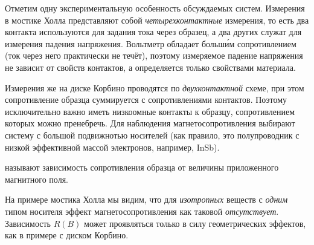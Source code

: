 \begin{lab:note}
Отметим одну экспериментальную особенность обсуждаемых систем. Измерения 
в мостике Холла представляют собой \emph{четырехконтактные}
измерения, то есть два контакта используются для задания тока через образец, а 
два других служат для измерения падения напряжения. Вольтметр обладает
больш\'{и}м сопротивлением (ток через него практически не
течёт), поэтому измеряемое падение напряжения не зависит от свойств
контактов, а определяется только свойствами материала.

Измерения же на диске Корбино проводятся по \emph{двухконтактной}
схеме, при этом сопротивление образца суммируется с сопротивлениями
контактов. Поэтому исключительно важно иметь низкоомные контакты к образцу,
сопротивлением которых можно пренебречь. Для наблюдения магнетосопротивления 
выбирают систему с большой подвижнотью носителей (как правило, 
это полупроводник с низкой эффективной массой электронов, например, InSb).
\end{lab:note}


 называют зависимость
сопротивления образца от величины приложенного магнитного поля.

На примере мостика Холла мы видим, что для \emph{изотропных} веществ с
\emph{одним} типом носителя эффект магнетосопротивления
как таковой \emph{отсутствует}. Зависимость $R(B)$ может проявляться
только в силу геометрических эффектов, как в примере с диском Корбино.

